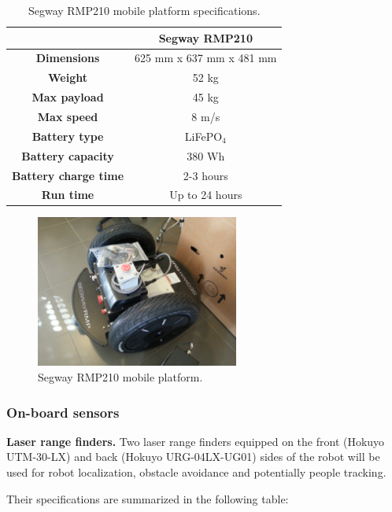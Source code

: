 \begin{table}[h!]
\begin{center}
\begin{tabular}{|c|c|}
\hline 
& \bf{Segway RMP210}\\
\hline \bf{Dimensions } & 625 mm x 637 mm x 481 mm \\
\hline \bf{ Weight } & 52 kg \\
\hline \bf{ Max payload } & 45 kg \\
\hline \bf{ Max speed } & 8 m/s \\
\hline \bf{ Battery type } & LiFePO$_4$ \\
\hline \bf{ Battery capacity } & 380 Wh \\
\hline \bf{ Battery charge time } & 2-3 hours \\
\hline \bf{ Run time } & Up to 24 hours \\
\hline
\end{tabular}
\end{center}
\caption{Segway RMP210 mobile platform specifications.}
\end{table}

\begin{figure}[h!]
\begin{center}
\includegraphics[height=5cm]{fig/segway_rmp210.jpg}
\end{center}
\caption{Segway RMP210 mobile platform.}
\label{fig:segway}
\end{figure}

\subsubsection{On-board sensors}

{\bf Laser range finders.} Two laser range finders equipped on the
front (Hokuyo UTM-30-LX) and back (Hokuyo URG-04LX-UG01) sides of the
robot will be used for robot localization, obstacle avoidance and
potentially people tracking.

Their specifications are summarized in the following table:

